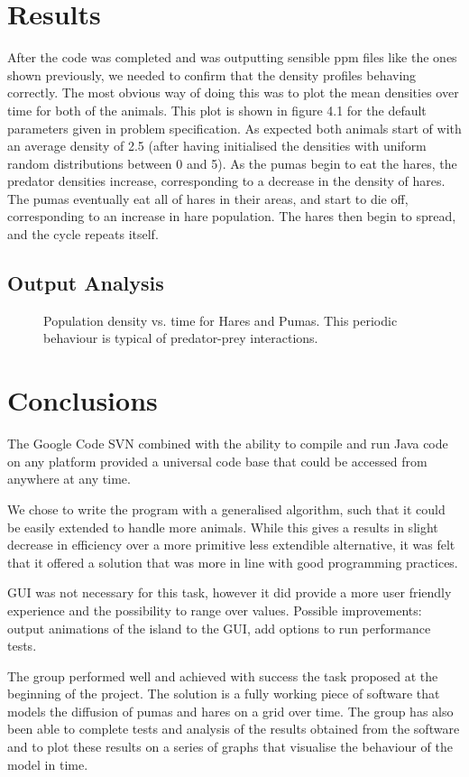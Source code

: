 \documentclass[11pt]{report}
\begin{document}
\chapter{Results}
After the code was completed and was outputting sensible ppm files like the ones shown previously, we needed to confirm that the density profiles behaving correctly. The most obvious way of doing this was to plot the mean densities over time for both of the animals. This plot is shown in figure 4.1 for the default parameters given in problem specification. As expected both animals start of with an average density of 2.5 (after having initialised the densities with uniform random distributions between 0 and 5). As the pumas begin to eat the hares, the predator densities increase, corresponding to a decrease in the density of hares.
The pumas eventually eat all of hares in their areas, and start to die off, corresponding to an increase in hare population. The hares then begin to spread, and the cycle repeats itself.

	\section{Output Analysis}
	\begin{figure}[H]
   
   
   \caption{Population density vs. time for Hares and Pumas. This periodic behaviour is typical of predator-prey interactions.}
   \end{figure}



\chapter{Conclusions} %

	The Google Code SVN combined with the ability to compile and run Java code on any platform provided a universal code base that could be accessed from anywhere at any time.  
	
We chose to write the program with a generalised algorithm, such that it could be easily extended to handle more animals. While this gives a results in slight decrease in efficiency over a more primitive less extendible alternative, it was felt that it offered a solution that was more in line with good programming practices.

GUI was not necessary for this task, however it did provide a more user friendly experience and the possibility to range over values. Possible improvements: output animations of the island to the GUI, add options to run performance tests.
  
The group performed well and achieved with success the task proposed at the beginning of the project. The solution is a fully working piece of software that models the diffusion of pumas and hares on a grid over time. The group has also been able to complete tests and analysis of the results obtained from the software and to plot these results on a series of graphs that visualise the behaviour of the model in time.
\end{document}
